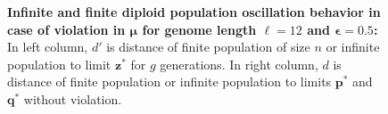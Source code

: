 \begin{figure}[h]
\begin{center}
\hspace{-3em}%
\vspace{-0.5em}  \hspace{-3em}%


\caption[\textbf{Infinite and finite diploid population oscillation behavior in case of violation in $\bm{\mu}$ for genome length $\ell = 12$ and $\bm{\epsilon} = 0.5$}]{\textbf{Infinite and finite diploid population oscillation behavior in case of violation in $\bm{\mu}$ for genome length $\ell = 12$ and $\bm{\epsilon} = 0.5$:} 
  In left column, $d'$ is distance of finite population of size $n$ or infinite population to limit $\bm{z}^\ast$ for $g$ generations. In right column, $d$ is distance of finite population or infinite population to limits $\bm{p}^\ast$ and $\bm{q}^\ast$ without violation.}
\label{oscillation_12d_vio_mu_0.5}
\end{center}
\end{figure}

